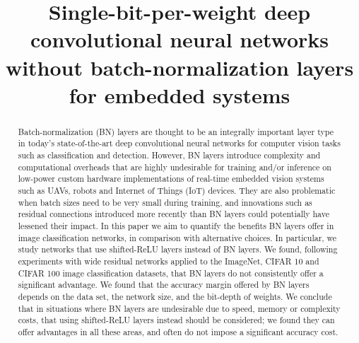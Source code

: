 \documentclass[conference]{IEEEtran}
\begin{document}
\title{Single-bit-per-weight deep convolutional neural
networks without batch-normalization layers for embedded systems}





\author{
\and
{}
\and
{}
}



\maketitle

\begin{abstract}
Batch-normalization (BN) layers are thought to be an integrally important layer type in today's state-of-the-art deep convolutional neural networks for computer vision tasks such as classification and detection. However, BN layers introduce complexity and computational overheads that are highly undesirable for training and/or inference on low-power custom hardware implementations of real-time embedded vision systems such as UAVs, robots and Internet of Things (IoT) devices. They are also problematic when batch sizes need to be very small during training, and   innovations such as residual connections  introduced more recently than BN layers  could potentially have lessened their impact. In this paper we aim to quantify the benefits BN layers offer in image classification networks, in comparison with alternative choices. In particular, we study networks that use shifted-ReLU layers instead of BN layers. We found, following experiments with wide residual networks applied to the ImageNet, CIFAR 10 and CIFAR 100  image classification datasets, that BN layers do not consistently offer a significant advantage. We found that the accuracy margin offered by BN layers depends on the data set, the network size, and the bit-depth of weights. We conclude that in situations where BN layers are undesirable due to speed, memory or complexity costs, that using shifted-ReLU layers instead should be considered; we found they can offer advantages in all these areas, and often do not impose a significant accuracy cost.
\end{abstract}
\end{document}
